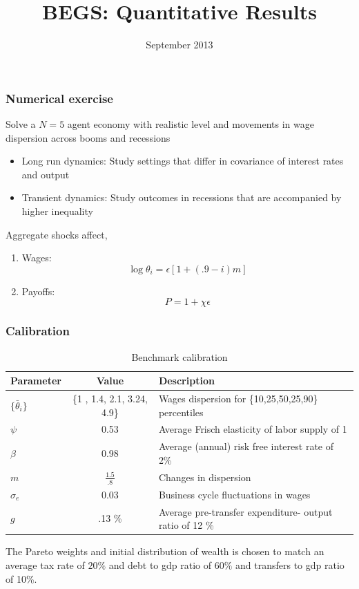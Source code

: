 \documentclass{beamer}
\title {BEGS: Quantitative Results}
\date{September 2013}
\begin{document}
%
\begin{frame}
\titlepage

\end{frame}


\begin{frame}
\frametitle{Numerical exercise}
 
Solve a $N=5$ agent economy with realistic level and movements in wage dispersion across booms and recessions

\begin{itemize}
 \item Long run dynamics: Study settings that differ in covariance of interest rates and output
 \item Transient dynamics: Study outcomes in recessions that are accompanied by higher inequality
\end{itemize}

Aggregate shocks affect,
\begin{enumerate}
\item Wages: \[\log \theta_i=\epsilon [1+(.9-i)m]\]
 \item Payoffs: \[P=1+\chi \epsilon \]
\end{enumerate}

\end{frame}

\begin{frame}
\frametitle{Calibration}

\begin{table}[htp]
\small
\begin{tabular}{|l|c|p{4cm}|}
\hline
Parameter & Value & Description   \\ \hline
$\{\bar{\theta}_i\} $ & \{1 ,  1.4,  2.1,  3.24,  4.9\} & Wages dispersion for \{10,25,50,25,90\} percentiles   \\
$\psi$ & 0.53 & Average Frisch elasticity of labor supply of 1 \\
$\beta$ & 0.98  &Average (annual) risk free interest rate of 2\%   \\
$m$ &$\frac{1.5}{.8}$& Changes in dispersion \\
$\sigma_e$ & 0.03 & Business cycle fluctuations in wages\\
$g$ & .13 \%&Average pre-transfer expenditure- output ratio of 12 \% \\\hline

\end{tabular}
\caption{Benchmark calibration}
\label{tab:Parameters}
\end{table}

The Pareto weights and initial distribution of wealth is chosen to match an average tax rate of $20\%$ and debt to gdp ratio of $60\%$ and transfers to gdp ratio of 10\%. 

\end{frame}
\end{document}
